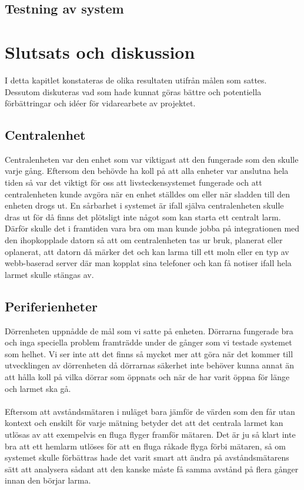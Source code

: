 \documentclass{article}
\begin{document}
\subsection{Testning av system}

\section{Slutsats och diskussion}
I detta kapitlet konstateras de olika resultaten utifrån målen som sattes.
Dessutom diskuteras vad som hade kunnat göras bättre och potentiella förbättringar och idéer för vidarearbete av projektet.\\

\subsection{Centralenhet}
Centralenheten var den enhet som var viktigast att den fungerade som den skulle varje gång.
Eftersom den behövde ha koll på att alla enheter var anslutna hela tiden så var det viktigt för oss att livsteckensystemet fungerade och att centralenheten kunde avgöra när en enhet ställdes om eller när sladden till den enheten drogs ut.
En sårbarhet i systemet är ifall själva centralenheten skulle dras ut för då finns det plötsligt inte något som kan starta ett centralt larm. 
Därför skulle det i framtiden vara bra om man kunde jobba på integrationen med den ihopkopplade datorn så att om centralenheten tas ur bruk, planerat eller oplanerat, att datorn då märker det och kan larma till ett moln eller en typ av webb-baserad server där man kopplat sina telefoner och kan få notiser ifall hela larmet skulle stängas av.


\subsection{Periferienheter}
\noindent
Dörrenheten uppnådde de mål som vi satte på enheten. 
Dörrarna fungerade bra och inga speciella problem framträdde under de gånger som vi testade systemet som helhet. 
Vi ser inte att det finns så mycket mer att göra när det kommer till utvecklingen av dörrenheten då dörrarnas säkerhet inte behöver kunna annat än att hålla koll på vilka dörrar som öppnats och när de har varit öppna för länge och larmet ska gå.\\
\\
\noindent
Eftersom att avståndsmätaren i nuläget bara jämför de värden som den får utan kontext och enskilt för varje mätning betyder det att det centrala larmet kan utlösas av att exempelvis en fluga flyger framför mätaren.
Det är ju så klart inte bra att ett hemlarm utlöses för att en fluga råkade flyga förbi mätaren, så om systemet skulle förbättras hade det varit smart att ändra på avståndsmätarens sätt att analysera sådant att den kanske måste få samma avstånd på flera gånger innan den börjar larma.\\
\end{document}
